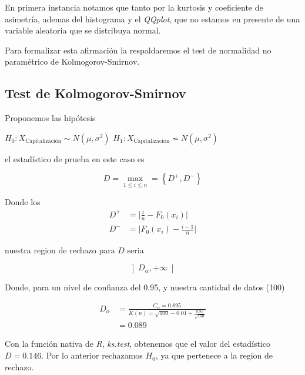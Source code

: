 \documentclass{article}
\begin{document}
    En primera instancia notamos que tanto por la kurtosis y coeficiente de asimetr\'ia, ademas del histograma y el \textit{QQplot}, que no estamos en presente de una variable aleatoria que se distribuya normal.

    Para formalizar esta afirmaci\'on la respaldaremos el test de normalidad no param\'etrico de Kolmogorov-Smirnov.

    \subsection{Test de Kolmogorov-Smirnov}

    Proponemos las hip\'otesis

    \begin{center}
        $H_0: X_{\text{Capitalizaci\'on}} \sim N(\mu, \sigma^2)$  $H_1: X_{\text{Capitalizaci\'on}} \not\sim N(\mu, \sigma^2)$
    \end{center}

    el estad\'istico de prueba en este caso es

    \begin{equation}
        D = \max\limits_{1\leq i \leq n} = \left\{D^{+}, D^{-}\right\}
    \end{equation}
    
    Donde los 
    \begin{align}
        D^{+} &= \Big| \frac{i}{n} - F_0 (x_i) \Big| \\
        D^{-} &= \Big| F_0 (x_i) - \frac{i - 1}{n} \Big| 
    \end{align}

    nuestra region de rechazo para $D$ seria

    \begin{equation}
        \left] D_\alpha, +\infty \right[
    \end{equation}

    Donde, para un nivel de confianza del 0.95, y nuestra cantidad de datos (100)
    
    \begin{align}
        D_\alpha &= \frac{C_\alpha = 0.895}{K(n) = \sqrt{100} - 0.01 + \frac{0.85}{\sqrt{100}}} \\
                 &= 0.089
    \end{align}

    Con la funci\'on nativa de \textit{R}, \textit{ks.test}, obtenemos que el valor del estad\'istico $D = 0.146$. Por lo anterior rechazamos $H_0$, ya que pertenece a la region de rechazo.
    
\end{document}
